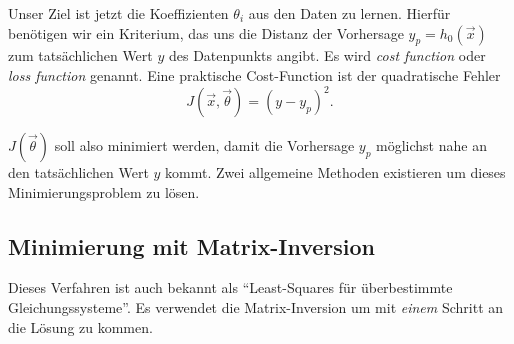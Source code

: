 Unser Ziel ist jetzt die Koeffizienten $\theta_i$ aus den Daten zu lernen. Hierfür
benötigen wir ein Kriterium, das uns die Distanz der Vorhersage $y_p = h_0(\vec x)$ zum tatsächlichen
Wert $y$ des Datenpunkts angibt. Es wird \emph{cost function} oder
\emph{loss function} genannt. Eine praktische Cost-Function ist der quadratische Fehler
\begin{equation}
J(\vec x, \vec \theta) = (y - y_p)^2.
\label{ml:regression:cost:sqerr}
\end{equation}

$J(\vec \theta)$ soll also minimiert werden, damit die Vorhersage $y_p$ möglichst nahe an den
tatsächlichen Wert $y$ kommt. Zwei allgemeine Methoden existieren um dieses
Minimierungsproblem zu lösen.

\subsection{Minimierung mit Matrix-Inversion}

Dieses Verfahren ist auch bekannt als ``Least-Squares für überbestimmte
Gleichungssysteme''. Es verwendet die Matrix-Inversion um mit \emph{einem} Schritt an die
Lösung zu kommen.

